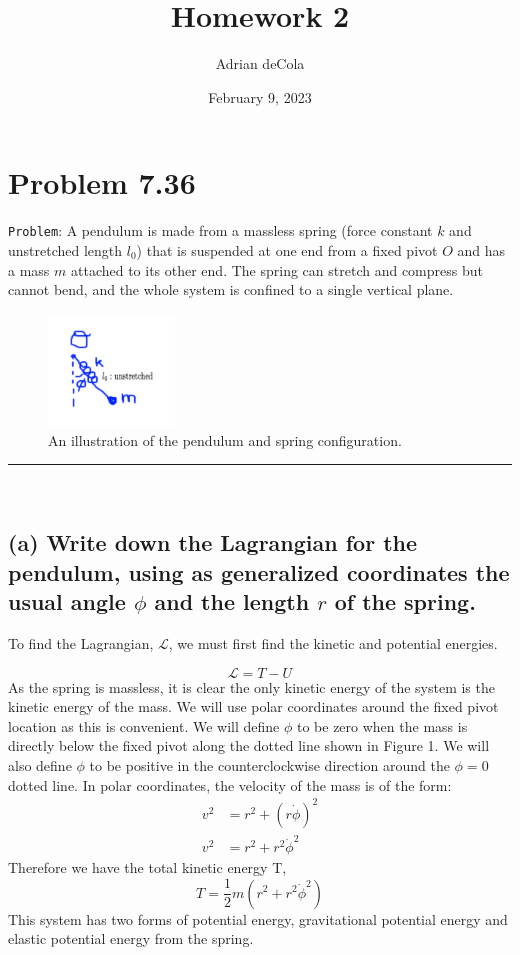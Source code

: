 \documentclass{article}
\title{Homework 2}
\author{Adrian deCola}
\date{February 9, 2023}
\begin{document}
\maketitle


\section*{Problem 7.36}
\verb+Problem+: A pendulum is made from a massless spring (force constant $k$ and unstretched length $l_0$) that is suspended at one end from a fixed pivot $O$ and has a mass $m$ attached to its other end. The spring can stretch and compress but cannot bend, and the whole system is confined to a single vertical plane.

\begin{figure}[!h]
    \centering
    \includegraphics[width=0.3\textwidth]{hw2_fig1.png}
    \caption{An illustration of the pendulum and spring configuration.}
\end{figure}

\hrule
         \ \ \ 

\subsection*{(a) Write down the Lagrangian for the pendulum, using as generalized coordinates the usual angle $\phi$ and the length $r$ of the spring.}
To find the Lagrangian, $\mathcal{L}$, we must first find the kinetic and potential energies. 

$$\mathcal{L} = T - U$$
As the spring is massless, it is clear the only kinetic energy of the system is the kinetic energy of the mass. We will use polar coordinates around the fixed pivot location as this is convenient. We will define $\phi$ to be zero when the mass is directly below the fixed pivot along the dotted line shown in Figure 1. We will also define $\phi$ to be positive in the counterclockwise direction around the $\phi=0$ dotted line. In polar coordinates, the velocity of the mass is of the form:
    \begin{align*}
    v^2 &= r^2 + (r\dot{\phi})^2 \\
    v^2 &= r^2 + r^2\dot{\phi}^2
    \end{align*}
Therefore we have the total kinetic energy T, 
$$T = \frac{1}{2}m(r^2 + r^2\dot{\phi}^2)$$
This system has two forms of potential energy, gravitational potential energy and elastic potential energy from the spring.
\end{document}

